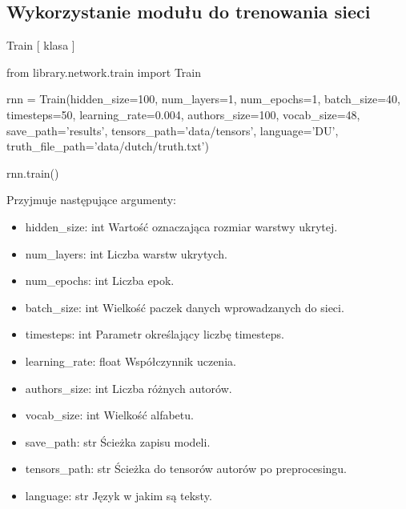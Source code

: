 \newpage
\subsection{Wykorzystanie modułu do trenowania sieci}
\myspace
{}
\myspace

\item{Train [ klasa ]}
\begin{import}
from library.network.train import Train

rnn = Train(hidden_size=100,
            num_layers=1,
            num_epochs=1,
            batch_size=40,
            timesteps=50,
            learning_rate=0.004,
            authors_size=100,
            vocab_size=48,
            save_path='results',
            tensors_path='data/tensors',
            language='DU',
            truth_file_path='data/dutch/truth.txt')
            
rnn.train()
\end{import}

Przyjmuje następujące argumenty:
\begin{itemize}
	\item hidden\_size: int
		\newline Wartość oznaczająca rozmiar warstwy ukrytej.
	\item num\_layers: int
		\newline Liczba warstw ukrytych.
	\item num\_epochs: int
		\newline Liczba epok.
	\item batch\_size: int
		\newline Wielkość paczek danych wprowadzanych do sieci.
	\item timesteps: int
		\newline Parametr określający liczbę timesteps.
	\item learning\_rate: float
		\newline Współczynnik uczenia.
	\item authors\_size: int
		\newline Liczba różnych autorów.
	\item vocab\_size: int
		\newline Wielkość alfabetu.
	\item save\_path: str
		\newline Ścieżka zapisu modeli.
	\item tensors\_path: str
		\newline Ścieżka do tensorów autorów po preprocesingu.
	\item language: str
		\newline Język w jakim są teksty.
		
\end{itemize}

